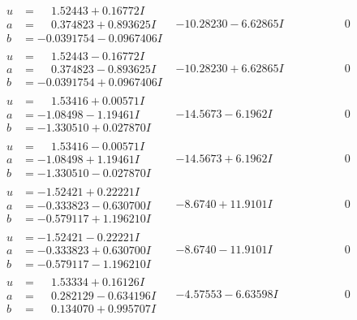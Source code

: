 \documentclass[1p]{elsarticle_modified}
\theoremstyle{definition}
\begin{document}
$$\begin{array}{c|c|c}
\begin{aligned}
u &= \phantom{-}1.52443 + 0.16772 I \\
a &= \phantom{-}0.374823 + 0.893625 I \\
b &= -0.0391754 - 0.0967406 I\end{aligned}
 & -10.28230 - 6.62865 I & \phantom{-0.000000 } 0 \\ \hline\begin{aligned}
u &= \phantom{-}1.52443 - 0.16772 I \\
a &= \phantom{-}0.374823 - 0.893625 I \\
b &= -0.0391754 + 0.0967406 I\end{aligned}
 & -10.28230 + 6.62865 I & \phantom{-0.000000 } 0 \\ \hline\begin{aligned}
u &= \phantom{-}1.53416 + 0.00571 I \\
a &= -1.08498 - 1.19461 I \\
b &= -1.330510 + 0.027870 I\end{aligned}
 & -14.5673 - 6.1962 I & \phantom{-0.000000 } 0 \\ \hline\begin{aligned}
u &= \phantom{-}1.53416 - 0.00571 I \\
a &= -1.08498 + 1.19461 I \\
b &= -1.330510 - 0.027870 I\end{aligned}
 & -14.5673 + 6.1962 I & \phantom{-0.000000 } 0 \\ \hline\begin{aligned}
u &= -1.52421 + 0.22221 I \\
a &= -0.333823 - 0.630700 I \\
b &= -0.579117 + 1.196210 I\end{aligned}
 & -8.6740 + 11.9101 I & \phantom{-0.000000 } 0 \\ \hline\begin{aligned}
u &= -1.52421 - 0.22221 I \\
a &= -0.333823 + 0.630700 I \\
b &= -0.579117 - 1.196210 I\end{aligned}
 & -8.6740 - 11.9101 I & \phantom{-0.000000 } 0 \\ \hline\begin{aligned}
u &= \phantom{-}1.53334 + 0.16126 I \\
a &= \phantom{-}0.282129 - 0.634196 I \\
b &= \phantom{-}0.134070 + 0.995707 I\end{aligned}
 & -4.57553 - 6.63598 I & \phantom{-0.000000 } 0\\

\end{array}$$
\end{document}
